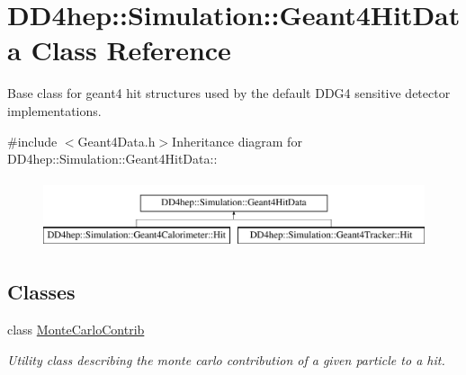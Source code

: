 \hypertarget{class_d_d4hep_1_1_simulation_1_1_geant4_hit_data}{
\section{DD4hep::Simulation::Geant4HitData Class Reference}
\label{class_d_d4hep_1_1_simulation_1_1_geant4_hit_data}
}


Base class for geant4 hit structures used by the default DDG4 sensitive detector implementations.  


{\ttfamily \#include $<$Geant4Data.h$>$}Inheritance diagram for DD4hep::Simulation::Geant4HitData::\begin{figure}[H]
\begin{center}
\leavevmode
\includegraphics[height=2cm]{class_d_d4hep_1_1_simulation_1_1_geant4_hit_data}
\end{center}
\end{figure}
\subsection*{Classes}
\begin{DoxyCompactItemize}
\item 
class \hyperlink{class_d_d4hep_1_1_simulation_1_1_geant4_hit_data_1_1_monte_carlo_contrib}{MonteCarloContrib}
\begin{DoxyCompactList}\small\item\em Utility class describing the monte carlo contribution of a given particle to a hit. \item\end{DoxyCompactList}\end{DoxyCompactItemize}
